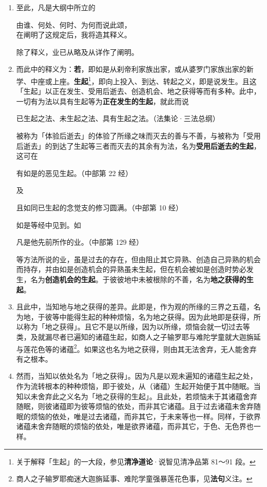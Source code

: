 \begin{enumerate}
\item 至此，凡是大纲中所立的\begin{quoting}由谁、何处、何时、为何而说此颂，\\在阐明了这规定后，我将造其释义。\end{quoting}除了释义，业已从略及从详作了阐明。
\item 而此中的释义为：\textbf{若}，即如是从刹帝利家族出家，或从婆罗门家族出家的新学、中座或上座。\textbf{生起}\footnote{关于解释「生起」的一大段，参见\textbf{清净道论}·说智见清净品第 81～91 段。}，即向上投入、到达、转起之义，即是说发生。且这「生起」以正在发生、受用后逝去、创造机会、地之获得等而有多种。此中，一切有为法以具有生起等为\textbf{正在发生的生起}，就此而说\begin{quoting}已生起之法、未生起之法、具有生起之法。（法集论·三法总纲）\end{quoting}被称为「体验后逝去」的体验了所缘之味而灭去的善与不善，与被称为「受用后逝去」的到达了生起等三者而灭去的其余有为法，名为\textbf{受用后逝去的生起}，这可在\begin{quoting}有如是的恶见生起。（中部第 22 经）\end{quoting}及\begin{quoting}且如同已生起的念觉支的修习圆满。（中部第 10 经）\end{quoting}如是等经中见到。如\begin{quoting}凡是他先前所作的业。（中部第 129 经）\end{quoting}等方法所说的业，虽是过去的存在，但由阻止其它异熟、创造自己异熟的机会而持存，并由如是创造机会的异熟虽未生起，但在机会被如是创造时势必发生，名为\textbf{创造机会的生起}。于彼彼地中未被根除的不善，名为\textbf{地之获得的生起}。
\item 且此中，当知地与地之获得的差异。此即是，作为观的所缘的三界之五蕴，名为地，于彼等中能得生起的种种烦恼，名为地之获得。因为此地即是获得，所以称为「地之获得」。且它不是以所缘，因为以所缘，烦恼会就一切过去等类，及就漏尽者已遍知的诸蕴生起，如商人之子输罗耶与难陀学童就大迦旃延与莲花色等的诸蕴\footnote{商人之子输罗耶痴迷大迦旃延事、难陀学童强暴莲花色事，见\textbf{法句}义注。}。如果这也名为地之获得，则由其无法舍弃，无人能舍弃有之根本。
\item 然而，当知以依处名为「地之获得」。因为凡是以观未遍知的诸蕴生起之处，作为流转根本的种种烦恼，即于彼处，从（诸蕴）生起开始便于其中随眠。当知以未舍弃此之义名为「地之获得的生起」。且此处，若烦恼未于其诸蕴舍弃随眠，则彼诸蕴即为彼等烦恼的依处，而非其它诸蕴。且于过去诸蕴未舍弃随眠的烦恼的依处，唯是过去诸蕴，而非其它，于未来等也一样。同样，于欲界诸蕴未舍弃随眠的烦恼的依处，唯是欲界诸蕴，而非其它，于色、无色界也一样。

\end{enumerate}

